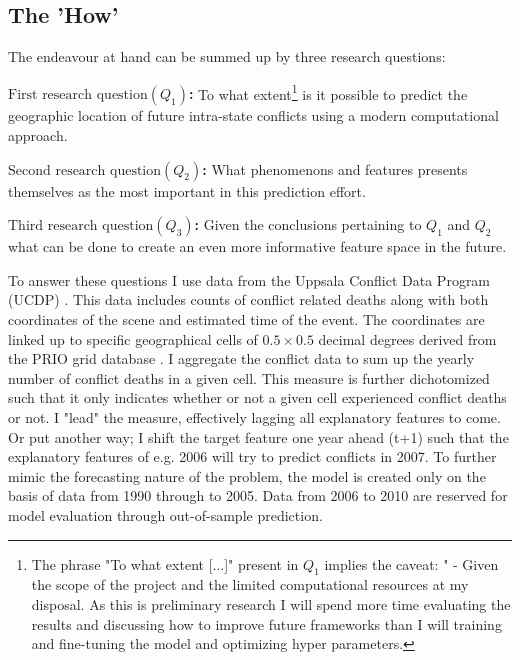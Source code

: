 \documentclass[a4paper]{article}
\begin{document}
\subsection{The 'How'}

The endeavour at hand can be summed up by three research questions:\par

\textbf{$\textrm{First research question} (Q_{1})$:} To what extent\footnote{The phrase "To what extent [...]" present in $Q_1$ implies the caveat: " - Given the scope of the project and the limited computational resources at my disposal. As this is preliminary research I will spend more time evaluating the results and discussing how to improve future frameworks than I will training and fine-tuning the model and optimizing hyper parameters.} is it possible to predict the geographic location of future intra-state conflicts using a modern computational approach.\par

\textbf{$\textrm{Second research question} (Q_{2})$:} What phenomenons and features presents themselves as the most important in this prediction effort.\par

\textbf{$\textrm{Third research question} (Q_{3})$:} Given the conclusions pertaining to $Q_1$ and $Q_2$ what can be done to create an even more informative feature space in the future.\par

To answer these questions I use data from the Uppsala Conflict Data Program (UCDP) \citep{Sundberg_2013, Croicu_Sundberg_2017}. This data includes counts of conflict related deaths along with both coordinates of the scene and estimated time of the event. The coordinates are linked up to specific geographical cells of $0.5 \times 0.5$ decimal degrees derived from the PRIO grid database \citep{Tollefsen_2012}. I aggregate the conflict data to sum up the yearly number of conflict deaths in a given cell. This measure is further dichotomized such that it only indicates whether or not a given cell experienced conflict deaths or not. I "lead" the measure, effectively lagging all explanatory features to come. Or put another way; I shift the target feature one year ahead (t+1) such that the explanatory features of e.g. 2006 will try to predict conflicts in 2007. To further mimic the forecasting nature of the problem, the model is created only on the basis of data from 1990 through to 2005. Data from 2006 to 2010 are reserved for model evaluation through out-of-sample prediction.\par
\end{document}
